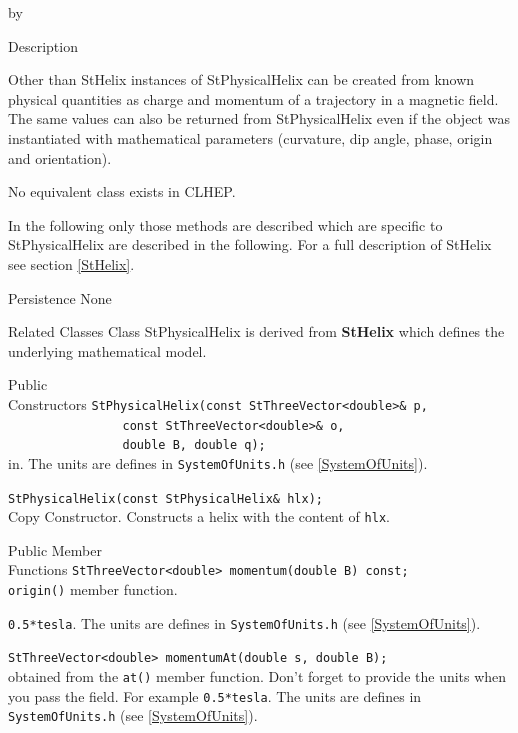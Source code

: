 \documentclass[twoside]{article}
\newcommand{\comp}[1]{\texttt{#1}}%
\newcommand{\entrylabel}[1]{\mbox{\textbf{{#1}}}\hfil}%
\newenvironment{entry}
{\begin{list}{}%
    {\renewcommand{\makelabel}{\entrylabel}%
     \setlength{\labelwidth}{90pt}%
     \setlength{\leftmargin}{\labelwidth}
     \advance\leftmargin by \labelsep%
      }%
    }%
  {\end{list}}
\newcommand{\Entrylabel}[1]%
{\raisebox{0pt}[1ex][0pt]{\makebox[\labelwidth][l]%
    {\parbox[t]{\labelwidth}{\hspace{0pt}\textbf{{#1}}}}}}
\newenvironment{Entry}%
{\renewcommand{\entrylabel}{\Entrylabel}\begin{entry}}%
  {\end{entry}}
\begin{document}
\begin{description}
\begin{Entry}
\item[Description]   

    Other than StHelix instances of StPhysicalHelix can be created
    from known physical quantities as charge and momentum
    of a trajectory in a magnetic
    field. The same values can also be returned from
    StPhysicalHelix even if the object was instantiated with mathematical
    parameters (curvature, dip angle, phase, origin and orientation).
        
    No equivalent class exists in CLHEP.

    In the following only those methods are described which are specific
    to StPhysicalHelix are described in the following. For a full description of
    StHelix see section \ref{StHelix}.
    
\item[Persistence]
    None

\item[Related Classes]
    Class StPhysicalHelix is derived from {\bf StHelix}
    which defines the underlying mathematical model.
    
\item[Public\\ Constructors]
    \verb+StPhysicalHelix(const StThreeVector<double>& p, + \\
    \verb+                const StThreeVector<double>& o, + \\
    \verb+                double B, double q);+ \\
    in. The units are defines in \texttt{SystemOfUnits.h}
    (see \ref{SystemOfUnits}).
    
    \verb+StPhysicalHelix(const StPhysicalHelix& hlx);+\\
    Copy Constructor. Constructs a helix with the content of \comp{hlx}.
            
\item[Public Member\\ Functions]
    \verb+StThreeVector<double> momentum(double B) const;+\\
    \comp{origin()} member function.
    
    \texttt{0.5*tesla}. The units are defines in \texttt{SystemOfUnits.h}
    (see \ref{SystemOfUnits}).

    \verb+StThreeVector<double> momentumAt(double s, double B);+\\
    obtained from the \comp{at()} member function.
    Don't forget to provide the units when you pass the field. For example
    \texttt{0.5*tesla}. The units are defines in \texttt{SystemOfUnits.h}
    (see \ref{SystemOfUnits}).
    

\end{Entry}
\end{description}
\end{document}
